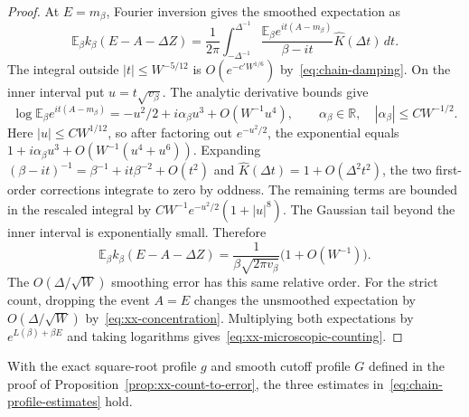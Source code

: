 \begin{proof}
At $E=m_\beta$, Fourier inversion gives the smoothed expectation as
\begin{equation}\label{eq:xx-smoothed-fourier}
 \mathbb E_\beta k_\beta(E-A-\Delta Z)
 =\frac{1}{2\pi}\int_{-\Delta^{-1}}^{\Delta^{-1}}
 \frac{\mathbb E_\beta e^{it(A-m_\beta)}}{\beta-it}
                   \widehat K(\Delta t)\,dt .
\end{equation}
The integral outside $|t|\le W^{-5/12}$ is
$O(e^{-c'W^{1/6}})$ by~\eqref{eq:chain-damping}. On the inner interval
put $u=t\sqrt{v_\beta}$. The analytic derivative bounds give
\[
 \log\mathbb E_\beta e^{it(A-m_\beta)}
 =-u^2/2+i\alpha_\beta u^3+O(W^{-1}u^4),
 \qquad \alpha_\beta\in\mathbb R,\quad |\alpha_\beta|\le C W^{-1/2}.
\]
Here $|u|\le C W^{1/12}$, so after factoring out $e^{-u^2/2}$, the
exponential equals $1+i\alpha_\beta u^3+O(W^{-1}(u^4+u^6))$.
Expanding $(\beta-it)^{-1}=\beta^{-1}+it\beta^{-2}+O(t^2)$ and
$\widehat K(\Delta t)=1+O(\Delta^2t^2)$, the two first-order corrections
integrate to zero by oddness. The remaining terms are bounded in the
rescaled integral by $C W^{-1}e^{-u^2/2}(1+|u|^8)$. The Gaussian
tail beyond the inner interval is exponentially small. Therefore
\[
 \mathbb E_\beta k_\beta(E-A-\Delta Z)
     =\frac{1}{\beta\sqrt{2\pi v_\beta}}\bigl(1+O(W^{-1})\bigr).
\]
The $O(\Delta/\sqrt W)$ smoothing error has this same relative order.
For the strict count, dropping the event $A=E$ changes the unsmoothed
expectation by $O(\Delta/\sqrt W)$ by~\eqref{eq:xx-concentration}.
Multiplying both expectations by $e^{L(\beta)+\beta E}$ and taking
logarithms gives~\eqref{eq:xx-microscopic-counting}.
\end{proof}

\begin{lemma}
\label{lem:chain-rank-profile}
With the exact square-root profile $g$ and smooth cutoff profile $G$
defined in the proof of Proposition~\ref{prop:xx-count-to-error}, the
three estimates in~\eqref{eq:chain-profile-estimates} hold.
\end{lemma}

